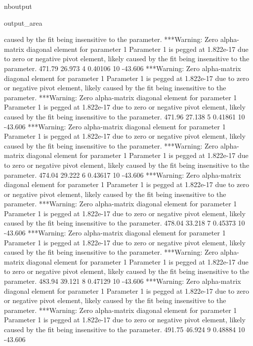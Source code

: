 \documentclass[letterpaper,10pt,english]{sphinxmanual}
\begin{document}
\begin{sphinxuseclass}{nboutput}
{\begin{sphinxuseclass}{output_area}
\begin{sphinxuseclass}{}
\begin{sphinxVerbatim}[commandchars=\\\{\}]
 caused by the fit being insensitive to the parameter.
***Warning: Zero alpha-matrix diagonal element for parameter 1
 Parameter 1 is pegged at 1.822e-17 due to zero or negative pivot element, likely
 caused by the fit being insensitive to the parameter.
          471.79      26.973    4     0.40106   10     -43.606
***Warning: Zero alpha-matrix diagonal element for parameter 1
 Parameter 1 is pegged at 1.822e-17 due to zero or negative pivot element, likely
 caused by the fit being insensitive to the parameter.
***Warning: Zero alpha-matrix diagonal element for parameter 1
 Parameter 1 is pegged at 1.822e-17 due to zero or negative pivot element, likely
 caused by the fit being insensitive to the parameter.
          471.96      27.138    5     0.41861   10     -43.606
***Warning: Zero alpha-matrix diagonal element for parameter 1
 Parameter 1 is pegged at 1.822e-17 due to zero or negative pivot element, likely
 caused by the fit being insensitive to the parameter.
***Warning: Zero alpha-matrix diagonal element for parameter 1
 Parameter 1 is pegged at 1.822e-17 due to zero or negative pivot element, likely
 caused by the fit being insensitive to the parameter.
          474.04      29.222    6     0.43617   10     -43.606
***Warning: Zero alpha-matrix diagonal element for parameter 1
 Parameter 1 is pegged at 1.822e-17 due to zero or negative pivot element, likely
 caused by the fit being insensitive to the parameter.
***Warning: Zero alpha-matrix diagonal element for parameter 1
 Parameter 1 is pegged at 1.822e-17 due to zero or negative pivot element, likely
 caused by the fit being insensitive to the parameter.
          478.04      33.218    7     0.45373   10     -43.606
***Warning: Zero alpha-matrix diagonal element for parameter 1
 Parameter 1 is pegged at 1.822e-17 due to zero or negative pivot element, likely
 caused by the fit being insensitive to the parameter.
***Warning: Zero alpha-matrix diagonal element for parameter 1
 Parameter 1 is pegged at 1.822e-17 due to zero or negative pivot element, likely
 caused by the fit being insensitive to the parameter.
          483.94      39.121    8     0.47129   10     -43.606
***Warning: Zero alpha-matrix diagonal element for parameter 1
 Parameter 1 is pegged at 1.822e-17 due to zero or negative pivot element, likely
 caused by the fit being insensitive to the parameter.
***Warning: Zero alpha-matrix diagonal element for parameter 1
 Parameter 1 is pegged at 1.822e-17 due to zero or negative pivot element, likely
 caused by the fit being insensitive to the parameter.
          491.75      46.924    9     0.48884   10     -43.606

\end{sphinxVerbatim}
\end{sphinxuseclass}
\end{sphinxuseclass}}
\end{sphinxuseclass}
\end{document}
